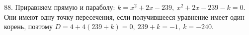 88. Приравняем прямую и параболу: $k=x^2+2x-239,\ x^2+2x-239-k=0.$ Они имеют одну точку пересечения, если получившееся уравнение имеет один корень, поэтому $D=4+4(239+k)=0,\ 239+k=-1,\ k=-240.$\\
